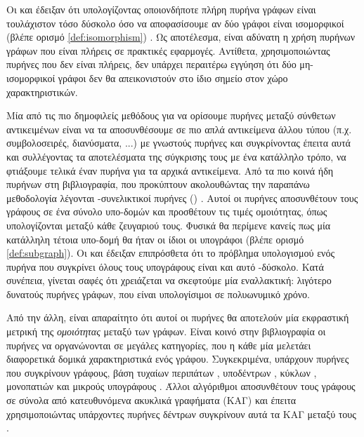 Οι  και  έδειξαν ότι υπολογίζοντας οποιονδήποτε πλήρη πυρήνα γράφων είναι τουλάχιστον τόσο δύσκολο όσο να αποφασίσουμε αν δύο γράφοι είναι ισομορφικοί (βλέπε ορισμό \ref{def:isomorphism}) \cite{Gartner03ongraph}.
Ως αποτέλεσμα, είναι αδύνατη η χρήση πυρήνων γράφων που είναι πλήρεις σε πρακτικές εφαρμογές.
Αντίθετα, χρησιμοποιώντας πυρήνες που δεν είναι πλήρεις, δεν υπάρχει περαιτέρω εγγύηση ότι δύο μη-ισομορφικοί γράφοι δεν θα απεικονιστούν στο ίδιο σημείο στον χώρο χαρακτηριστικών.\par
Μία από τις πιο δημοφιλείς μεθόδους για να ορίσουμε πυρήνες μεταξύ σύνθετων αντικειμένων είναι να τα αποσυνθέσουμε σε πιο απλά αντικείμενα άλλου τύπου (π.χ. συμβολοσειρές, διανύσματα, ...) με γνωστούς πυρήνες και συγκρίνοντας έπειτα αυτά και συλλέγοντας τα αποτελέσματα της σύγκρισης τους με ένα κατάλληλο τρόπο, να φτιάξουμε τελικά έναν πυρήνα για τα αρχικά αντικείμενα.
Από τα πιο κοινά ήδη πυρήνων στη βιβλιογραφία, που προκύπτουν ακολουθώντας την παραπάνω μεθοδολογία λέγονται -συνελικτικοί πυρήνες () \cite{Haussler1999ConvolutionKO}.
Αυτοί οι πυρήνες αποσυνθέτουν τους γράφους σε ένα σύνολο υπο-δομών και προσθέτουν τις τιμές ομοιότητας, όπως υπολογίζονται μεταξύ κάθε ζευγαριού τους.
Φυσικά θα περίμενε κανείς πως μία κατάλληλη τέτοια υπο-δομή θα ήταν οι ίδιοι οι υπογράφοι (βλέπε ορισμό \ref{def:subgraph}).
Οι  και  έδειξαν επιπρόσθετα ότι το πρόβλημα υπολογισμού ενός πυρήνα που συγκρίνει όλους τους υπογράφους είναι και αυτό -δύσκολο.
Κατά συνέπεια, γίνεται σαφές ότι χρειάζεται να σκεφτούμε μία εναλλακτική: λιγότερο δυνατούς πυρήνες γράφων, που είναι υπολογίσιμοι σε πολυωνυμικό χρόνο.\par
Από την άλλη, είναι απαραίτητο ότι αυτοί οι πυρήνες θα αποτελούν μία εκφραστική μετρική της \textit{ομοιότητας} μεταξύ των γράφων.
Είναι κοινό στην βιβλιογραφία οι πυρήνες να οργανώνονται σε μεγάλες κατηγορίες, που η κάθε μία μελετάει διαφορετικά δομικά χαρακτηριστικά ενός γράφου.
Συγκεκριμένα, υπάρχουν πυρήνες που συγκρίνουν γράφους, βάση τυχαίων περιπάτων \cite{gartner2003graph, borgwardt2005protein, vishwanathan2010graph}, υποδέντρων \cite{Ramon03expressivityversus, Bach2008, Mahe2009}, κύκλων \cite{Horvath2004}, μονοπατιών \cite{Borgwardt2005, Giscard2017} και μικρούς υπογράφους \cite{Costa2010, Hido2009, Kriege2012SubgraphMK, shervashidze2009efficient}.
Άλλοι αλγόριθμοι αποσυνθέτουν τους γράφους σε σύνολα από κατευθυνόμενα ακυκλικά γραφήματα (ΚΑΓ) και έπειτα χρησιμοποιώντας υπάρχοντες πυρήνες δέντρων συγκρίνουν αυτά τα ΚΑΓ μεταξύ τους \cite{Martino2006}.
